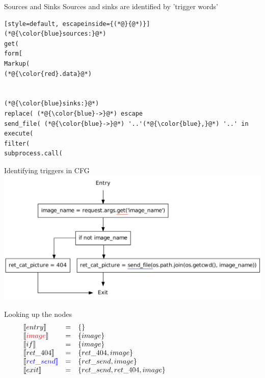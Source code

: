 \begin{frame}[fragile]{Sources and Sinks}
  Sources and sinks are identified by 'trigger words'
  \begin{lstlisting}[style=default, escapeinside={(*@}{@*)}]
(*@{\color{blue}sources:}@*)
get(
form[
Markup(
(*@{\color{red}.data}@*)


(*@{\color{blue}sinks:}@*)
replace( (*@{\color{blue}->}@*) escape
send_file( (*@{\color{blue}->}@*) '..'(*@{\color{blue},}@*) '..' in
execute(
filter(
subprocess.call(
\end{lstlisting}

\end{frame}

\begin{frame}{Identifying triggers in CFG}
  \includegraphics[width=1.05\textwidth]{graphics/cfg_path_traversal_triggers}
\end{frame}

\begin{frame}{Looking up the nodes}
\[
\begin{array}{lclcl}
  \constraint{entry} & = & \{\} &&\\
  \assignconstraint{image} & = & \{image\} &&\\
  \constraint{if} & = & \{image\} &&\\
  \constraint{ret\_404} & = & \{ret\_404, image\} &&\\
  \constraint{\color{blue}ret\_send} & = & \{ret\_send, image\} &&\\
  \constraint{exit} & = & \{ret\_send, ret\_404, image\} &&\\
  && \phantom{\{command, param\}} && \phantom{\{command, param\}}
\end{array}
\]
\end{frame}


